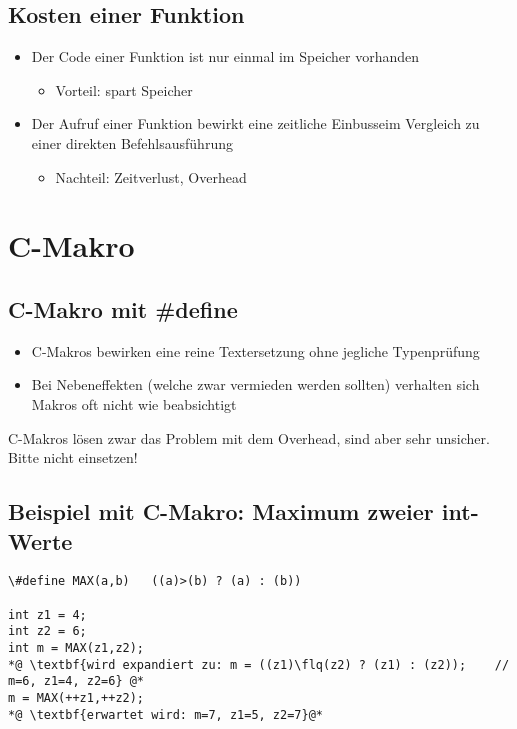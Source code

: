 \subsection{Kosten einer Funktion}
\label{sec:Kosten einer Funktion}
\begin{itemize}
	\item Der Code einer Funktion ist nur einmal im Speicher vorhanden
	\begin{itemize}
		\item Vorteil: spart Speicher
	\end{itemize}
	\item Der Aufruf einer Funktion bewirkt eine zeitliche Einbusseim Vergleich zu einer direkten Befehlsausführung
	\begin{itemize}
		\item Nachteil: Zeitverlust, Overhead
	\end{itemize}
\end{itemize}


\section{C-Makro}
\label{sec:C-Makro}

\subsection{C-Makro mit {\#define}}
\label{sec:C-Makro mit define}
\begin{itemize}
	\item C-Makros bewirken eine reine Textersetzung ohne jegliche Typenprüfung
	\item Bei Nebeneffekten (welche zwar vermieden werden sollten) verhalten sich Makros oft nicht wie beabsichtigt
\end{itemize}
\begin{achtung}	%
C-Makros lösen zwar das Problem mit dem Overhead, sind aber sehr unsicher. Bitte nicht einsetzen!
\end{achtung}


\subsection{Beispiel mit C-Makro: Maximum zweier int-Werte}
\label{sec:Beispiel mit C-Makro: Maximum zweier int-Werte}
\noindent
\begin{minipage}{\linewidth}
\begin{lstlisting}
\#define MAX(a,b)	((a)>(b) ? (a) : (b))

int z1 = 4;
int z2 = 6;
int m = MAX(z1,z2);
*@ \textbf{wird expandiert zu: m = ((z1)\flq(z2) ? (z1) : (z2));	// m=6, z1=4, z2=6} @*
m = MAX(++z1,++z2);
*@ \textbf{erwartet wird: m=7, z1=5, z2=7}@*
\end{lstlisting}
\end{minipage}

